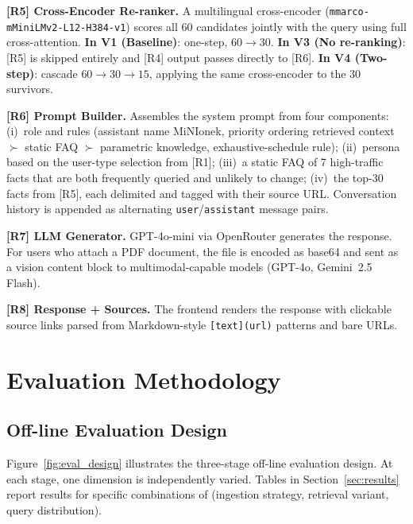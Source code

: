 \documentclass[sigconf,natbib=true]{acmart}
\begin{document}
\textbf{[R5] Cross-Encoder Re-ranker.}
A multilingual cross-encoder (\texttt{mmarco-mMiniLMv2-L12-H384-v1}) scores all 60 candidates jointly with the query using full cross-attention.
\textbf{In V1 (Baseline)}: one-step, $60 \to 30$.
\textbf{In V3 (No re-ranking)}: [R5] is skipped entirely and [R4] output passes directly to [R6].
\textbf{In V4 (Two-step)}: cascade $60 \to 30 \to 15$, applying the same cross-encoder to the 30 survivors.

\textbf{[R6] Prompt Builder.}
Assembles the system prompt from four components: (i)~role and rules (assistant name MiNIonek, priority ordering retrieved context $\succ$ static FAQ $\succ$ parametric knowledge, exhaustive-schedule rule); (ii)~persona based on the user-type selection from [R1]; (iii)~a static FAQ of 7 high-traffic facts that are both frequently queried and unlikely to change; (iv)~the top-30 facts from [R5], each delimited and tagged with their source URL. Conversation history is appended as alternating \texttt{user}/\texttt{assistant} message pairs.

\textbf{[R7] LLM Generator.}
GPT-4o-mini via OpenRouter generates the response. For users who attach a PDF document, the file is encoded as base64 and sent as a vision content block to multimodal-capable models (GPT-4o, Gemini~2.5 Flash).

\textbf{[R8] Response + Sources.}
The frontend renders the response with clickable source links parsed from Markdown-style \texttt{[text](url)} patterns and bare URLs.

\section{Evaluation Methodology}
\label{sec:eval}

\subsection{Off-line Evaluation Design}

Figure~\ref{fig:eval_design} illustrates the three-stage off-line evaluation design.
At each stage, one dimension is independently varied.
Tables in Section~\ref{sec:results} report results for specific combinations of (ingestion strategy, retrieval variant, query distribution).
\end{document}
